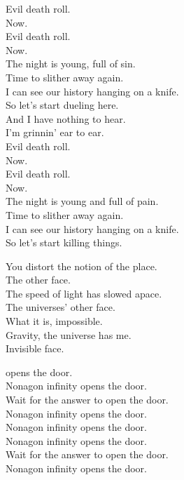 Evil death roll. \\
Now. \\
Evil death roll. \\
Now. \\

The night is young, full of sin. \\
Time to slither away again. \\
I can see our history hanging on a knife. \\

So let's start dueling here. \\
And I have nothing to hear. \\
I'm grinnin' ear to ear. \\

Evil death roll. \\
Now. \\
Evil death roll. \\
Now. \\

The night is young and full of pain. \\
Time to slither away again. \\
I can see our history hanging on a knife. \\
So let's start killing things. \\


You distort the notion of the place. \\
The  other face. \\
The speed of light has slowed apace. \\
The universes' other face. \\

What it is, impossible. \\
Gravity, the universe has me. \\
Invisible face. \\


 opens the door. \\
Nonagon infinity opens the door. \\
Wait for the answer to open the door. \\
Nonagon infinity opens the door. \\

Nonagon infinity opens the door. \\
Nonagon infinity opens the door. \\
Wait for the answer to open the door. \\
Nonagon infinity opens the door. \\

